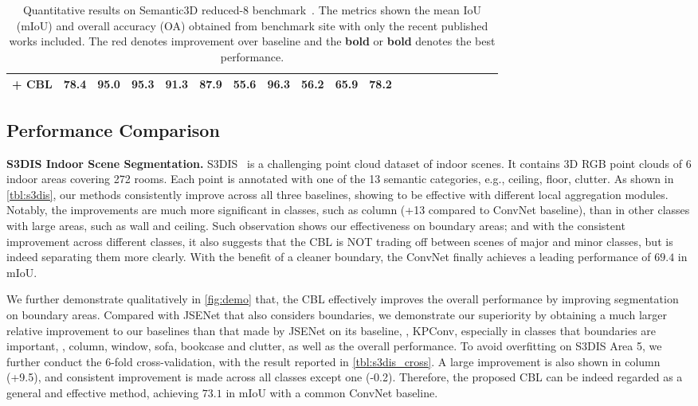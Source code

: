 \documentclass[10pt,twocolumn,letterpaper]{article}
\begin{document}
\begin{table*}
\begin{center}
{\begin{tabular}{r |cc|ccccccccccccccccc }
\textbf{ + CBL} & \textbf{\color{red} 78.4} & \textbf{\color{red} 95.0} & 95.3   & 91.3   & {\color{red} 87.9}   & \textbf{\color{red} 55.6}   & \textbf{\color{red} 96.3}   & \textbf{\color{red} 56.2}   & 65.9   & {\color{red}78.2} \\
\hline
\end{tabular}
}\end{center}
\caption{Quantitative results on Semantic3D reduced-8 benchmark~\cite{semantic3d}. The metrics shown the mean IoU (mIoU) and overall accuracy (OA) obtained from benchmark site with only the recent published works included. The {\color{red}red} denotes improvement over baseline and the \textbf{bold} or \textbf{\color{red}bold} denotes the best performance.}
\label{tbl:semantic3d}
\end{table*}


\subsection{Performance Comparison}
\noindent\textbf{S3DIS Indoor Scene Segmentation.}
S3DIS~\cite{s3dis} is a challenging point cloud dataset of indoor scenes. It contains 3D RGB point clouds of 6 indoor areas covering 272 rooms. Each point is annotated with one of the 13 semantic categories, e.g., ceiling, floor, clutter.
As shown in \cref{tbl:s3dis}, our methods consistently improve across all three baselines, showing to be effective with different local aggregation modules.
Notably, the improvements are much more significant in classes, such as column (+13 compared to ConvNet baseline), than in other classes with large areas, such as wall and ceiling. Such observation shows our effectiveness on boundary areas; and with the consistent improvement across different classes, it also suggests that the CBL is NOT trading off between scenes of major and minor classes, but is indeed separating them more clearly. With the benefit of a cleaner boundary, the ConvNet finally achieves a leading performance of $69.4$ in mIoU.

We further demonstrate qualitatively in \cref{fig:demo} that, the CBL effectively improves the overall performance by improving segmentation on boundary areas.
Compared with JSENet\cite{bound_3d_jse} that also considers boundaries, we demonstrate our superiority by obtaining a much larger relative improvement to our baselines than that made by JSENet on its baseline, \ie, KPConv\cite{kpconv}, especially in classes that boundaries are important, \eg, column, window, sofa, bookcase and clutter, as well as the overall performance.
To avoid overfitting on S3DIS Area 5, we further conduct the 6-fold cross-validation, with the result reported in \cref{tbl:s3dis_cross}. A large improvement is also shown in column (+9.5), and consistent improvement is made across all classes except one (-0.2). Therefore, the proposed CBL can be indeed regarded as a general and effective method, achieving $73.1$ in mIoU with a common ConvNet baseline.
\end{document}
